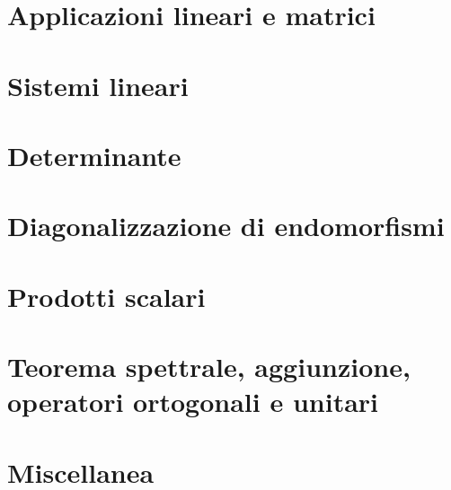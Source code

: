 \documentclass[9pt, a4paper]{article}
\theoremstyle{mythm}
\begin{document}
\clearpage

\section{Applicazioni lineari e matrici}


\clearpage

\section{Sistemi lineari}


\clearpage

\section{Determinante}


\clearpage

\section{Diagonalizzazione di endomorfismi}



\clearpage

\section{Prodotti scalari}



\clearpage

\section{Teorema spettrale, aggiunzione, operatori ortogonali e unitari}


\clearpage

\section{Miscellanea}

\end{document}
